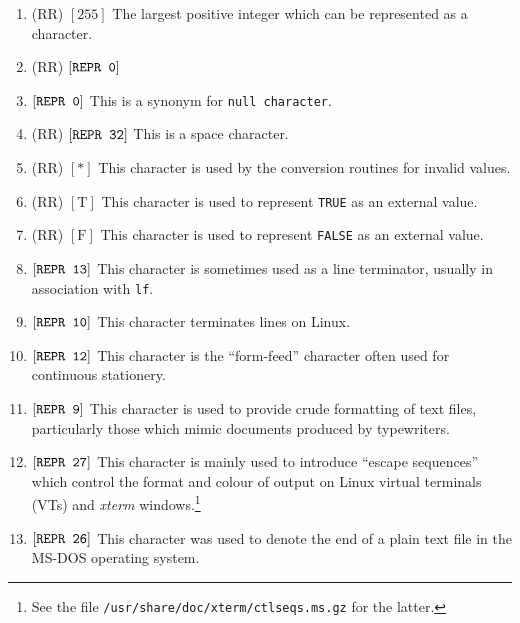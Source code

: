 \begin{enumerate}
\item {}
(RR) $[255]$ \newline
The largest positive integer which can be represented as a character.
\item {}
(RR) $[\mbox{\texttt{REPR 0}}]$
\item {}
$[\mbox{\texttt{REPR 0}}]$ \newline
This is a synonym for \verb|null character|.
\item {}
(RR) $[\mbox{\texttt{REPR 32}}]$ \newline
This is a space character.
\item {}
(RR) $[\ast]$ \newline
This character is used by the conversion routines for invalid values.
\item {} (RR) $[\mbox{T}]$
\newline
This character is used to represent \verb|TRUE| as an external value.
\item {} (RR) $[\mbox{F}]$
\newline
This character is used to represent \verb|FALSE| as an external value.
\item {}
$[\mbox{\texttt{REPR 13}}]$ \newline
This character is sometimes used as a line terminator, usually in
association with \verb|lf|.
\item {}
$[\mbox{\texttt{REPR 10}}]$  \newline
This character terminates lines on Linux.
\item {}
$[\mbox{\texttt{REPR 12}}]$ \newline
This character is the ``form-feed'' character often used for
continuous stationery.
\item {}
$[\mbox{\texttt{REPR 9}}]$ \newline
This character is used to provide crude formatting of text files,
particularly those which mimic documents produced by typewriters.

\item {}
$[\mbox{\texttt{REPR 27}}]$ \newline
This character is mainly used to introduce ``escape sequences'' which
control the format and colour of output on Linux virtual terminals
(VTs) and \textit{xterm} windows.\footnote{See the file
\texttt{/usr/share/doc/xterm/ctlseqs.ms.gz} for the latter.}
\item {}
$[\mbox{\texttt{REPR 26}}]$ \newline
This character was used to denote the end of a plain text file in the
MS-DOS operating system.
\end{enumerate}

